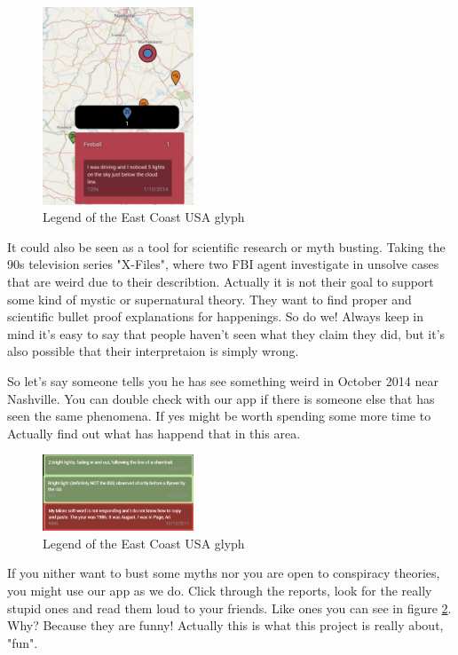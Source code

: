 \documentclass{article}
\begin{document}
\newpage

\begin{figure} 
    \centering
    \includegraphics[width=0.4\textwidth]{Tennesee}
    \caption{Legend of the East Coast USA glyph}
    \label{fig:Tennesee}
\end{figure}

It could also be seen as a tool for scientific research or myth busting. Taking the 90s television series "X-Files", where two FBI agent investigate in unsolve cases that are weird due to their describtion. Actually it is not their goal to support some kind of mystic or supernatural theory.
They want to find proper and scientific bullet proof explanations for happenings. So do we! Always keep in mind it's easy to say that people haven't seen what they claim they did, but it's also possible that their interpretaion is simply wrong.

So let's say someone tells you he has see something weird in October 2014 near Nashville. You can double check with our app
if there is someone else that has seen the same phenomena. If yes might be worth spending some more time to Actually find out
what has happend that in this area.\\

\begin{figure} 
    \centering
    \includegraphics[width=0.4\textwidth]{funnyFindings}
    \caption{Legend of the East Coast USA glyph}
    \label{fig:funnyFindings}
\end{figure}

If you nither want to bust some myths nor you are open to conspiracy theories, 
you might use our app as we do. Click through the reports, look for the really 
stupid ones and read them loud to your friends. Like ones you can see in figure \ref{fig:funnyFindings}.
 Why? Because they are funny! Actually this is what this project is really about, "fun".
\end{document}
